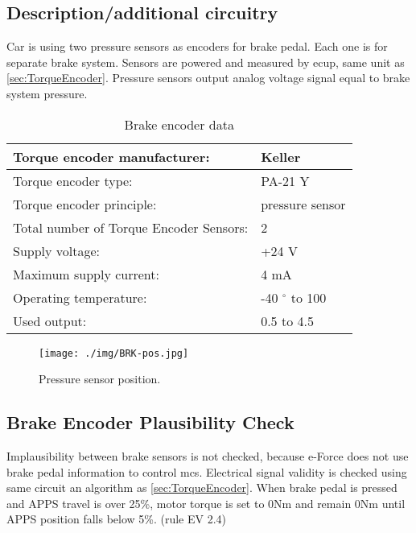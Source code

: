 \subsection{Description/additional circuitry}
Car is using two pressure sensors as encoders for brake pedal. Each one is for separate brake system. Sensors are powered and measured by \gls{ecup}, same unit as \ref{sec:TorqueEncoder}. Pressure sensors output analog voltage signal equal to brake system pressure. 


\begin{table}[H]
	\centering
	\caption{Brake encoder data}
	\begin{tabu}{|X|X|}
		\hline
		Torque encoder manufacturer: &  Keller \\\hline
		Torque encoder type: & PA-21 Y \\\hline
		Torque encoder principle: & pressure sensor \\\hline
		Total number of Torque Encoder Sensors: & 2 \\\hline
		Supply voltage: & +24 V \\\hline
		Maximum supply current: &  4 mA  \\\hline
		Operating temperature: & -40 $^\circ$ to 100 \degC \\\hline
		Used output: & 0.5 \vdc to 4.5 \vdc \\\hline
	\end{tabu}%
	\label{tab:brake-general}%
\end{table}%

\begin{figure}[H]
	\begin{center}
		\texttt{[image: ./img/BRK-pos.jpg]}
		\caption{Pressure sensor position.}
		\label{fig:brake_pressure_position}
	\end{center}
\end{figure}

\subsection{Brake Encoder Plausibility Check}
Implausibility between brake sensors is not checked, because e-Force does not use brake pedal information to control \glspl{mc}.
Electrical signal validity is checked using same circuit an algorithm as \ref{sec:TorqueEncoder}. 
When brake pedal is pressed and APPS travel is over 25\%, motor torque is set to 0Nm and remain 0Nm until APPS position falls below 5\%. (rule EV 2.4)

